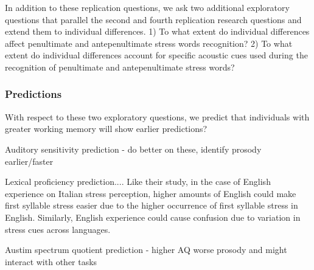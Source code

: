 In addition to these replication questions, we ask two additional exploratory questions that parallel the second and fourth replication research questions and extend them to individual differences. 1) To what extent do individual differences affect penultimate and antepenultimate stress words recognition? 2) To what extent do individual differences account for specific acoustic cues used during the recognition of penultimate and antepenultimate stress words?

\subsubsection{Predictions}

With respect to these two exploratory questions, we predict that individuals with greater working memory will show earlier predictions? \citep[e.g.,][]{Traxler2009}

Auditory sensitivity prediction - do better on these, identify prosody earlier/faster

Lexical proficiency prediction....  Like their study, in the case of English experience on Italian stress perception, higher amounts of English could make first syllable stress easier due to the higher occurrence of first syllable stress in English. Similarly, English experience could cause confusion due to variation in stress cues across languages.

Austim spectrum quotient prediction - higher AQ worse prosody and might interact with other tasks 
